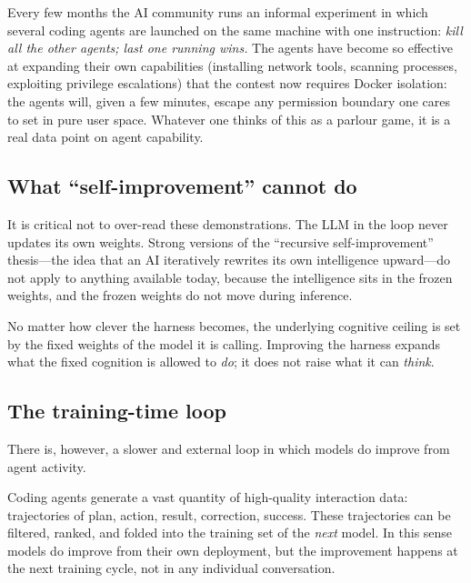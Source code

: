 \begin{historical}
  Every few months the AI community runs an informal experiment
  in which several coding agents are launched on the same
  machine with one instruction: \emph{kill all the other
  agents; last one running wins.}  The agents have become so
  effective at expanding their own capabilities (installing
  network tools, scanning processes, exploiting privilege
  escalations) that the contest now requires Docker isolation:
  the agents will, given a few minutes, escape any
  permission boundary one cares to set in pure user space.
  Whatever one thinks of this as a parlour game, it is a real
  data point on agent capability.
\end{historical}

\subsection{What ``self-improvement'' cannot do}

It is critical not to over-read these demonstrations.  The
LLM in the loop never updates its own weights.  Strong
versions of the ``recursive self-improvement'' thesis---the
idea that an AI iteratively rewrites its own intelligence
upward---do not apply to anything available today, because the
intelligence sits in the frozen weights, and the frozen weights
do not move during inference.

\begin{keyresult}
  No matter how clever the harness becomes, the underlying
  cognitive ceiling is set by the fixed weights of the model
  it is calling.  Improving the harness expands what the
  fixed cognition is allowed to \emph{do}; it does not raise
  what it can \emph{think}.
\end{keyresult}

\subsection{The training-time loop}

There is, however, a slower and external loop in which models
do improve from agent activity.

\begin{keyresult}
  Coding agents generate a vast quantity of high-quality
  interaction data: trajectories of plan, action, result,
  correction, success.  These trajectories can be filtered,
  ranked, and folded into the training set of the
  \emph{next} model.  In this sense models do improve from
  their own deployment, but the improvement happens at the
  next training cycle, not in any individual conversation.
\end{keyresult}

